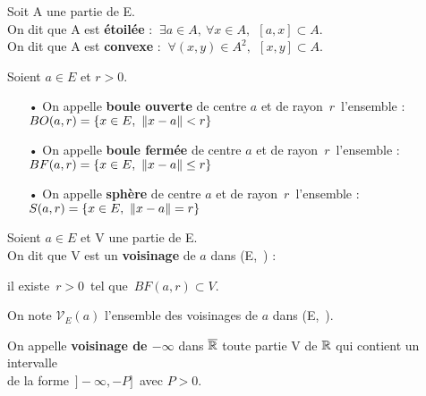 \vspace{1cm}

Soit A une partie de E. \vspace{0.1cm}\\
On dit que A est \textbf{étoilée} \ssi : \(\ \exists a\in A,\ \forall x\in A,\ \ [a,x]\subset A. \) \vspace{0.2cm} \\
On dit que A est \textbf{convexe} \ssi : \(\ \forall(x,y)\in A^2,\ \ [x,y]\subset A. \)

\vspace{1.3cm}

Soient \(a\in E\) et \(r>0\).
\begin{itemize}[leftmargin=0.3cm]
    \item[•] On appelle \textbf{boule ouverte} de centre \(a\) et de rayon \(\,r\,\) l'ensemble : \(BO(a,r)=\{ x\in E,\ \norm{x-a}< r\}  \)\vspace{0.1cm}

    \item[•] On appelle \textbf{boule fermée} de centre \(a\) et de rayon \(\,r\,\) l'ensemble : \(BF(a,r)=\{ x\in E,\ \norm{x-a}\leq r\}  \)\vspace{0.1cm}

    \item[•] On appelle \textbf{sphère} de centre \(a\) et de rayon \(\,r\,\) l'ensemble : \(S(a,r)=\{ x\in E,\ \left\lVert x-a\right\rVert= r\}  \)
\end{itemize}

\vspace{0.8cm}

Soient \(a\in E\) et V une partie de E.\vspace{0.1cm}\\
On dit que V est un \textbf{voisinage} de $a$ dans (E,\ \normtxt{\ }) \ssi :\vspace{0.15cm}

\hspace{5cm} il existe $\,r>0\,$ tel que \(\,BF(a,r)\subset V\).\vspace{0.7cm}

\noindent On note \(\mathcal{V}_E(a)\) l'ensemble des voisinages de $a$ dans (E,\ \normtxt{\ }).

\vspace{0.7cm}

On appelle \textbf{voisinage de \(-\infty\)} dans \(\overline{\mathbb{R}}\) toute partie V de \(\mathbb{R}\) qui contient un intervalle\\
de la forme \(\,]-\infty,-P]\,\) avec \(P>0\).\vspace{0.1cm}

